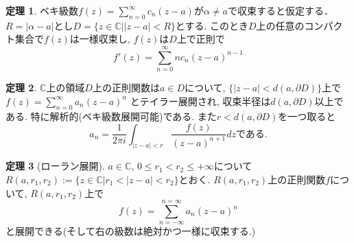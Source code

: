 \documentclass[dvipdfmx,a4paper,11pt]{article}
\newcommand{\C}{\mathbb{C}}
\theoremstyle{definition}
\newtheorem{thm}{定理}
\begin{document}
\begin{tcolorbox}[
    colback = white,
    colframe = green!35!black,
    fonttitle = \bfseries,
    breakable = true]
    \begin{thm}
ベキ級数$f(z) = \sum_{n=0}^{\infty}c_n (z -a)$が$\alpha \neq a$で収束すると仮定する．
$R = |\alpha - a|$とし$D = \{ z\in \C | |z  - a| < R \}$とする.
このとき$D$上の任意のコンパクト集合で$f(z)$は一様収束し, $f(z)$は$D$上で正則で
$$
f'(z) =  \sum_{n=0}^{\infty}n c_n (z -a)^{n-1}
$$
    \end{thm}
\end{tcolorbox} 

\begin{tcolorbox}[
    colback = white,
    colframe = green!35!black,
    fonttitle = \bfseries,
    breakable = true]
    \begin{thm}
$\C$上の領域$D$上の正則関数は$a \in D$について, $\{ |z - a| < d(a, \partial D)\}$上で
$f(z)=\sum_{n=0}^{\infty}a_n(z - a)^{n}$
とテイラー展開され, 収束半径は$d(a, \partial D)$以上である. 
特に解析的(ベキ級数展開可能)である.
また$r < d(a, \partial D)$を一つ取ると
$$
a_n = \frac{1}{2 \pi i}\int_{|z - a| <r}\frac{f(z)}{(z-a)^{n+1}} dz \text{である.}
$$
    \end{thm}
\end{tcolorbox} 


\begin{tcolorbox}[
    colback = white,
    colframe = green!35!black,
    fonttitle = \bfseries,
    breakable = true]
    \begin{thm}[ローラン展開]
$a \in \C$, $0 \le r_1 < r_2 \le + \infty$について$R(a, r_1, r_2):=\{ z \in \C | r_1 < |z - a|  < r_2 \}$とおく.
$R(a, r_1, r_2)$上の正則関数$f$について, $R(a, r_1, r_2)$上で
$$
f(z) = \sum_{n=-\infty}^{n=\infty} a_n (z - a)^{n}
$$
と展開できる(そして右の級数は絶対かつ一様に収束する.)
    \end{thm}
\end{tcolorbox} 
\end{document}
